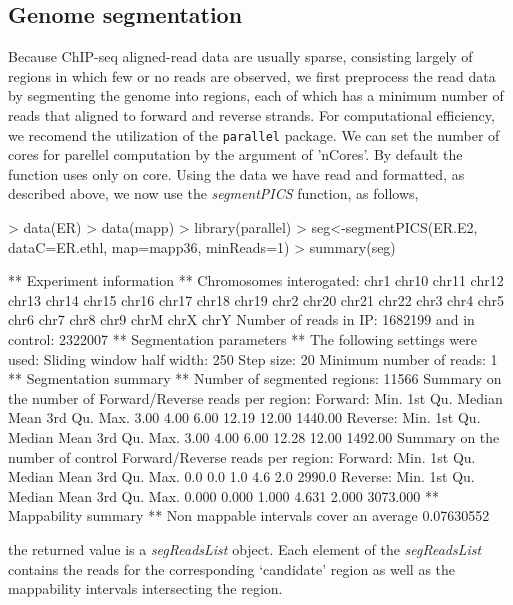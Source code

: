 \documentclass[12pt]{article}
\newcommand{\Rfunction}[1]{{\textit{#1}}}
\newcommand{\Rpackage}[1]{\texttt{#1}}
\newcommand{\Rclass}[1]{{\textit{#1}}}
\begin{document}
\subsection{Genome segmentation}

Because ChIP-seq aligned-read data are usually sparse, consisting largely of regions in which few or no reads are observed, we first preprocess the read data by segmenting the genome into regions, each of which has a minimum number of reads that aligned to forward and reverse strands. For computational efficiency, we recomend the utilization of the \Rpackage{parallel} package. We can set the number of cores for parellel computation by the argument of 'nCores'. By default the function uses only on core. Using the data we have read and formatted, as described above, we now use the \Rfunction{segmentPICS} function, as follows,
\begin{Schunk}
\begin{Sinput}
> data(ER)
> data(mapp)
> library(parallel)
> seg<-segmentPICS(ER.E2, dataC=ER.ethl, map=mapp36, minReads=1)
> summary(seg)
\end{Sinput}
\begin{Soutput}
** Experiment information ** 
Chromosomes interogated: chr1 chr10 chr11 chr12 chr13 chr14 chr15 chr16 chr17 chr18 chr19 chr2 chr20 chr21 chr22 chr3 chr4 chr5 chr6 chr7 chr8 chr9 chrM chrX chrY 
Number of reads in IP:  1682199  and in control:  2322007 
** Segmentation parameters ** 
The following settings were used:
  Sliding window half width:  250 
  Step size:  20 
  Minimum number of reads:  1 
** Segmentation summary ** 
Number of segmented regions: 11566 
Summary on the number of Forward/Reverse reads per region:
  Forward:
     Min. 1st Qu.  Median    Mean 3rd Qu.    Max. 
   3.00    4.00    6.00   12.19   12.00 1440.00 
  Reverse:
     Min. 1st Qu.  Median    Mean 3rd Qu.    Max. 
   3.00    4.00    6.00   12.28   12.00 1492.00 
Summary on the number of control Forward/Reverse reads per region:
  Forward:
     Min. 1st Qu.  Median    Mean 3rd Qu.    Max. 
    0.0     0.0     1.0     4.6     2.0  2990.0 
  Reverse:
      Min.  1st Qu.   Median     Mean  3rd Qu.     Max. 
   0.000    0.000    1.000    4.631    2.000 3073.000 
** Mappability summary **
Non mappable intervals cover an average  0.07630552 %
\end{Soutput}
\end{Schunk}

the returned value is a \Rclass{segReadsList} object. Each element of the \Rclass{segReadsList} contains the reads for the corresponding `candidate' region as well as the mappability intervals intersecting the region.
 
\end{document}
